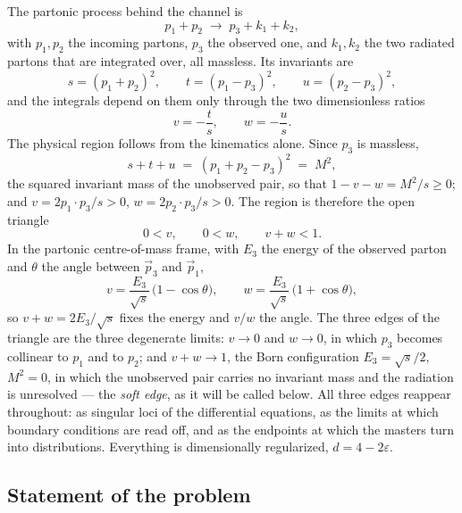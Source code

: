 \documentclass[11pt]{article}
\newcommand{\eps}{\varepsilon}
\begin{document}
The partonic process behind the channel is
\begin{equation}
  p_1 + p_2 \;\longrightarrow\; p_3 + k_1 + k_2 ,
\end{equation}
with $p_1, p_2$ the incoming partons, $p_3$ the observed one, and
$k_1, k_2$ the two radiated partons that are integrated over, all
massless.  Its invariants are
\begin{equation}
  s = (p_1+p_2)^2, \qquad t = (p_1-p_3)^2, \qquad u = (p_2-p_3)^2 ,
\end{equation}
and the integrals depend on them only through the two dimensionless
ratios
\begin{equation}
  v = -\frac{t}{s}, \qquad w = -\frac{u}{s} .
\end{equation}
The physical region follows from the kinematics alone.  Since $p_3$
is massless,
\begin{equation}
  s + t + u \;=\; (p_1+p_2-p_3)^2 \;=\; M^2 ,
\end{equation}
the squared invariant mass of the unobserved pair, so that
$1 - v - w = M^2/s \ge 0$; and $v = 2p_1\!\cdot\! p_3/s > 0$,
$w = 2p_2\!\cdot\! p_3/s > 0$.  The region is therefore the open
triangle
\begin{equation}
  0 < v, \qquad 0 < w, \qquad v + w < 1 .
  \label{eq:region}
\end{equation}
In the partonic centre-of-mass frame, with $E_3$ the energy of the
observed parton and $\theta$ the angle between $\vec p_3$ and
$\vec p_1$,
\begin{equation}
  v = \frac{E_3}{\sqrt s}\,\big(1 - \cos\theta\big),
  \qquad
  w = \frac{E_3}{\sqrt s}\,\big(1 + \cos\theta\big),
  \label{eq:vwangle}
\end{equation}
so $v + w = 2E_3/\sqrt s$ fixes the energy and $v/w$ the angle.  The
three edges of the triangle are the three degenerate limits:
$v \to 0$ and $w \to 0$, in which $p_3$ becomes collinear to $p_1$
and to $p_2$; and $v + w \to 1$, the Born configuration
$E_3 = \sqrt{s}/2$, $M^2 = 0$, in which the unobserved pair carries
no invariant mass and the radiation is unresolved --- the \emph{soft
edge}, as it will be called below.  All three edges reappear throughout: as
singular loci of the differential equations, as the limits at which
boundary conditions are read off, and as the endpoints at which the
masters turn into distributions.  Everything is dimensionally
regularized, $d = 4 - 2\eps$.

\subsection{Statement of the problem}
\end{document}
